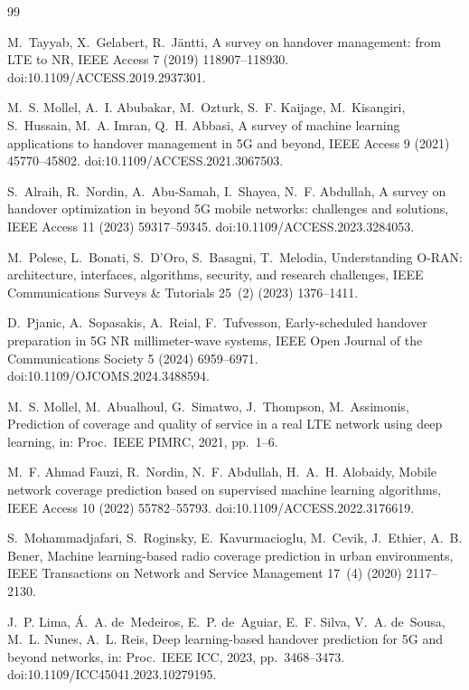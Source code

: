 \documentclass[preprint,review,12pt]{elsarticle}
\begin{document}
\newpage
\begin{thebibliography}{99}

M.~Tayyab, X.~Gelabert, R.~J\"antti, A survey on handover management: from LTE to
NR, IEEE Access 7 (2019) 118907--118930. doi:10.1109/ACCESS.2019.2937301.

M.~S. Mollel, A.~I. Abubakar, M.~Ozturk, S.~F. Kaijage, M.~Kisangiri, S.~Hussain,
M.~A. Imran, Q.~H. Abbasi, A survey of machine learning applications to handover
management in 5G and beyond, IEEE Access 9 (2021) 45770--45802.
doi:10.1109/ACCESS.2021.3067503.

S.~Alraih, R.~Nordin, A.~Abu-Samah, I.~Shayea, N.~F. Abdullah, A survey on handover
optimization in beyond 5G mobile networks: challenges and solutions, IEEE Access 11
(2023) 59317--59345. doi:10.1109/ACCESS.2023.3284053.

M.~Polese, L.~Bonati, S.~D'Oro, S.~Basagni, T.~Melodia, Understanding O-RAN:
architecture, interfaces, algorithms, security, and research challenges, IEEE
Communications Surveys \& Tutorials 25~(2) (2023) 1376--1411.

D.~Pjanic, A.~Sopasakis, A.~Reial, F.~Tufvesson, Early-scheduled handover
preparation in 5G NR millimeter-wave systems, IEEE Open Journal of the
Communications Society 5 (2024) 6959--6971. doi:10.1109/OJCOMS.2024.3488594.

M.~S. Mollel, M.~Abualhoul, G.~Simatwo, J.~Thompson, M.~Assimonis, Prediction of
coverage and quality of service in a real LTE network using deep learning, in:
Proc.\ IEEE PIMRC, 2021, pp.~1--6.

M.~F. Ahmad Fauzi, R.~Nordin, N.~F. Abdullah, H.~A.~H. Alobaidy, Mobile network
coverage prediction based on supervised machine learning algorithms, IEEE Access 10
(2022) 55782--55793. doi:10.1109/ACCESS.2022.3176619.

S.~Mohammadjafari, S.~Roginsky, E.~Kavurmacioglu, M.~Cevik, J.~Ethier, A.~B. Bener,
Machine learning-based radio coverage prediction in urban environments, IEEE
Transactions on Network and Service Management 17~(4) (2020) 2117--2130.

J.~P. Lima, \'A.~A. de~Medeiros, E.~P. de~Aguiar, E.~F. Silva, V.~A. de~Sousa,
M.~L. Nunes, A.~L. Reis, Deep learning-based handover prediction for 5G and beyond
networks, in: Proc.\ IEEE ICC, 2023, pp.~3468--3473.
doi:10.1109/ICC45041.2023.10279195.


\end{thebibliography}
\end{document}
